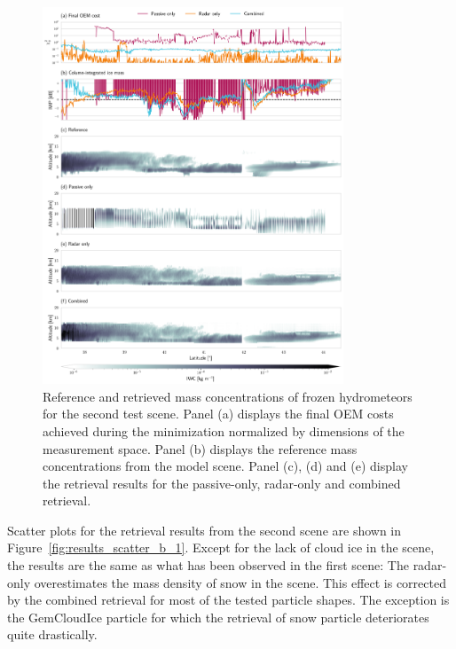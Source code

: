 \documentclass[journal abbreviation, manuscript]{copernicus}
\begin{document}
\begin{figure}
\centering
\includegraphics[width = 0.8\textwidth]{../plots/results_b_LargePlateAggregate}
\caption{Reference and retrieved mass concentrations of frozen hydrometeors for
 the second test scene. Panel (a) displays the final OEM costs achieved during
 the minimization normalized by dimensions of the measurement space. Panel (b)
 displays the reference mass concentrations from the model scene. Panel (c),
 (d) and (e) display the retrieval results for the passive-only, radar-only
 and combined retrieval.}
\label{fig:results_b}
\end{figure}

Scatter plots for the retrieval results from the second scene are shown
in Figure~\ref{fig:results_scatter_b_1}. Except for the lack of cloud ice
in the scene, the results are the same as what has been observed in the
first scene: The radar-only overestimates the mass density of snow in
the scene. This effect is corrected by the combined retrieval for most
of the tested particle shapes. The exception is the GemCloudIce particle
for which the retrieval of snow particle deteriorates quite drastically.
\end{document}
